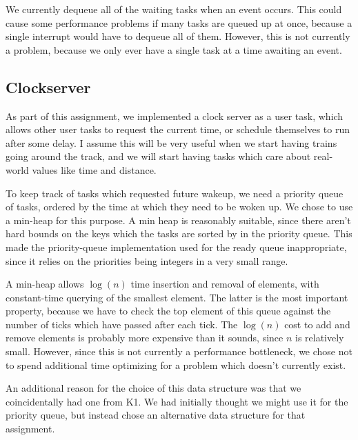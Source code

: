 \documentclass[titlepage]{article}
\begin{document}
We currently dequeue all of the waiting tasks when an event occurs. This could
cause some performance problems if many tasks are queued up at once, because
a single interrupt would have to dequeue all of them. However, this is not
currently a problem, because we only ever have a single task at a time
awaiting an event.

\subsection{Clockserver}
As part of this assignment, we implemented a clock server as a user task, which
allows other user tasks to request the current time, or schedule themselves to run
after some delay.
I assume this will be very useful
when we start having trains going around the track, and we will start having
tasks which care about real-world values like time and distance.

To keep track of tasks which requested future wakeup, we need a priority queue
of tasks, ordered by the time at which they need to be woken up.
We chose to use a min-heap for this purpose.
A min heap is reasonably suitable, since there aren't hard bounds on
the keys which the tasks are sorted by in the priority queue.
This made the priority-queue implementation used for the ready queue inappropriate,
since it relies on the priorities being integers in a very small range.

A min-heap allows $\log(n)$ time insertion and removal of elements, with
constant-time querying of the smallest element.
The latter is the most important property, because we have to check the top
element of this queue against the number of ticks which have passed after each tick.
The $\log(n)$ cost to add and remove elements is probably more expensive than it
sounds, since $n$ is relatively small.
However, since this is not currently a performance bottleneck, we chose not to spend
additional time optimizing for a problem which doesn't currently exist.

An additional reason for the choice of this data structure was that we coincidentally
had one from K1.
We had initially thought we might use it for the priority queue,
but instead chose an alternative data structure for that assignment.
\end{document}
